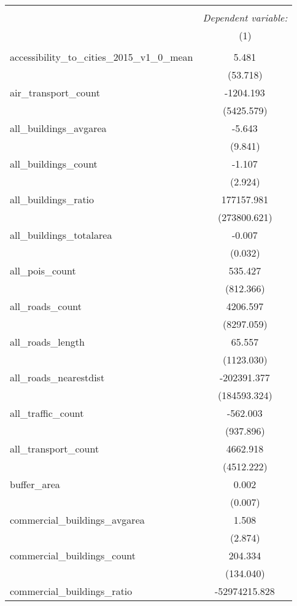 \begin{table}[!htbp] \centering
\begin{tabular}{@{\extracolsep{5pt}}lc}
\\[-1.8ex]\hline
\hline \\[-1.8ex]
& \multicolumn{1}{c}{\textit{Dependent variable:}} \
\cr \cline{1-2}
\\[-1.8ex] & (1) \\
\hline \\[-1.8ex]
 accessibility_to_cities_2015_v1_0_mean & 5.481$^{}$ \\
  & (53.718) \\
 air_transport_count & -1204.193$^{}$ \\
  & (5425.579) \\
 all_buildings_avgarea & -5.643$^{}$ \\
  & (9.841) \\
 all_buildings_count & -1.107$^{}$ \\
  & (2.924) \\
 all_buildings_ratio & 177157.981$^{}$ \\
  & (273800.621) \\
 all_buildings_totalarea & -0.007$^{}$ \\
  & (0.032) \\
 all_pois_count & 535.427$^{}$ \\
  & (812.366) \\
 all_roads_count & 4206.597$^{}$ \\
  & (8297.059) \\
 all_roads_length & 65.557$^{}$ \\
  & (1123.030) \\
 all_roads_nearestdist & -202391.377$^{}$ \\
  & (184593.324) \\
 all_traffic_count & -562.003$^{}$ \\
  & (937.896) \\
 all_transport_count & 4662.918$^{}$ \\
  & (4512.222) \\
 buffer_area & 0.002$^{}$ \\
  & (0.007) \\
 commercial_buildings_avgarea & 1.508$^{}$ \\
  & (2.874) \\
 commercial_buildings_count & 204.334$^{}$ \\
  & (134.040) \\
 commercial_buildings_ratio & -52974215.828$^{}$ \\

\end{tabular}
\end{table}
